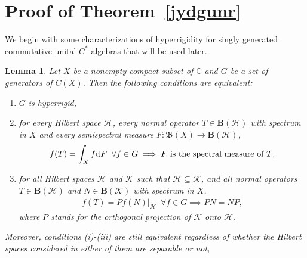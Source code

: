 \documentclass[reqno]{amsproc}
\numberwithin{equation}{section}
\newtheorem{lemma}[theorem]{Lemma}
\theoremstyle{remark}
\newcommand*{\hh}{\mathcal{H}}
\newcommand*{\kk}{\mathcal{K}}
\newcommand*{\comp}{\mathbb{C}}
\newcommand*{\borel}{\mathfrak{B}}
\newcommand*{\cbb}{\comp}
\newcommand*{\D}{\mathrm{d\hspace{.1ex}}}
\theoremstyle{definition}
\newcommand*{\ogr}{\boldsymbol{B}}
\begin{document}
   \section{\label{Sec.6}Proof of Theorem~\ref{jydgunr}}
We begin with some characterizations of hyperrigidity
for singly generated commutative unital $C^*$-algebras
that will be used later.
   \begin{lemma} \label{prejyd}
Let $X$ be a nonempty compact subset of $\cbb$ and $G$
be a set of generators of $C(X)$. Then the following
conditions are equivalent{\em :}
   \begin{enumerate}
   \item[(i)] $G$ is hyperrigid,
   \item[(ii)] for every Hilbert space $\hh$, every
normal operator $T\in \ogr(\hh)$ with spectrum in $X$
and every semispectral measure $F\colon \borel(X) \to
\ogr(\hh)$,
   \begin{align} \label{ftint}
f(T)=\int_{X} f \D F \;\; \forall f\in G \implies
\text{$F$ is the spectral measure of $T$,}
   \end{align}
   \item[(iii)] for all Hilbert spaces $\hh$ and $\kk$   such
that $\hh\subseteq \kk$, and all normal operators
$T\in \ogr(\hh)$ and $N\in \ogr(\kk)$ with spectrum in
$X$,
   \begin{align*}
f(T) = Pf(N)|_{\hh} \;\: \forall f\in G \implies
PN=NP,
   \end{align*}
where $P$ stands for the orthogonal projection of
$\kk$ onto $\hh$.
   \end{enumerate}
Moreover, conditions {\em (i)-(iii)} are still
equivalent regardless of whether the Hilbert spaces
considered in either of them are separable or not,
   \end{lemma}
\end{document}
